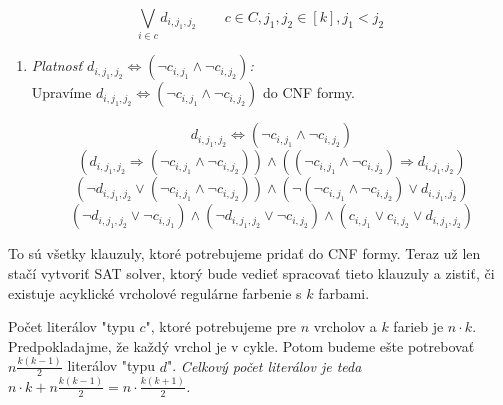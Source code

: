 \documentclass[11pt]{article}
\begin{document}
\begin{enumerate}
    $$\bigvee_{i\in c} d_{i, j_1, j_2} \qquad c\in C, j_1, j_2 \in [k], j_1 < j_2$$

    \begin{enumerate}
        \item \textit{Platnosť $d_{i, j_1, j_2} \Leftrightarrow \left(\neg c_{i, j_1} \land \neg c_{i, j_2}\right)$:}\\
        Upravíme $d_{i, j_1, j_2} \Leftrightarrow \left(\neg c_{i, j_1} \land \neg c_{i, j_2}\right)$ do CNF formy.

        $$d_{i, j_1, j_2} \Leftrightarrow \left(\neg c_{i, j_1} \land \neg c_{i, j_2}\right)$$
        $$\left(d_{i, j_1, j_2} \Rightarrow \left(\neg c_{i, j_1} \land \neg c_{i, j_2}\right) \right) \land \left(\left(\neg c_{i, j_1} \land \neg c_{i, j_2}\right) \Rightarrow d_{i, j_1, j_2}\right)$$
        $$\left(\neg d_{i, j_1, j_2} \lor \left(\neg c_{i, j_1} \land \neg c_{i, j_2}\right) \right) \land \left(\neg \left(\neg c_{i, j_1} \land \neg c_{i, j_2}\right) \lor d_{i, j_1, j_2}\right)$$
        $$\left( \neg d_{i, j_1, j_2} \lor \neg c_{i, j_1}\right) \land
        \left( \neg d_{i, j_1, j_2} \lor \neg c_{i, j_2}\right) \land
        \left(  c_{i, j_1} \lor c_{i, j_2} \lor d_{i, j_1, j_2}\right)$$
    \end{enumerate}

\end{enumerate}

To sú všetky klauzuly, ktoré potrebujeme pridať do CNF formy. Teraz už len stačí vytvoriť SAT solver, ktorý bude vedieť spracovať tieto klauzuly a zistiť, či existuje acyklické vrcholové regulárne farbenie s $k$ farbami.

Počet literálov "typu $c$", ktoré potrebujeme pre $n$ vrcholov a $k$ farieb je $n \cdot k$. Predpokladajme, že každý vrchol je v cykle. Potom budeme ešte potrebovať $n\frac{k(k-1)}{2}$ literálov "typu $d$". \textit{Celkový počet literálov je teda $n \cdot k + n\frac{k(k-1)}{2} = n \cdot \frac{k(k+1)}{2}$.}
\end{document}
